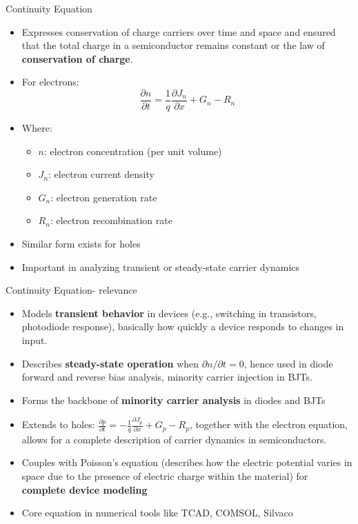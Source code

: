 \begin{frame}{Continuity Equation}
    \begin{itemize}
        \item Expresses conservation of charge carriers over time and space and ensured that the total charge in a semiconductor remains constant or the law of \textbf{conservation of charge}.
        \item For electrons:
        \begin{equation}
        \frac{\partial n}{\partial t} = \frac{1}{q} \frac{\partial J_n}{\partial x} + G_n - R_n
        \end{equation}
        \item Where:
        \begin{itemize}
            \item $n$: electron concentration (per unit volume)
            \item $J_n$: electron current density
            \item $G_n$: electron generation rate
            \item $R_n$: electron recombination rate
        \end{itemize}
        \item Similar form exists for holes
        \item Important in analyzing transient or steady-state carrier dynamics
    \end{itemize}
\end{frame}

\begin{frame}{Continuity Equation- relevance}
    \begin{itemize}
        \item Models \textbf{transient behavior} in devices (e.g., switching in transistors, photodiode response), basically how quickly a device responds to changes in input.
        \item Describes \textbf{steady-state operation} when $\partial n/\partial t = 0$, hence used in diode forward and reverse bias analysis, minority carrier injection in BJTs.
        \item Forms the backbone of \textbf{minority carrier analysis} in diodes and BJTs
        \item Extends to holes: \( \frac{\partial p}{\partial t} = -\frac{1}{q} \frac{\partial J_p}{\partial x} + G_p - R_p \), together with the electron equation, allows for a complete description of carrier dynamics in semiconductors.
        \item Couples with Poisson’s equation (describes how the electric potential varies in space due to the presence of electric charge within the material) for \textbf{complete device modeling} 
        \item Core equation in numerical tools like TCAD, COMSOL, Silvaco
    \end{itemize}
\end{frame}

